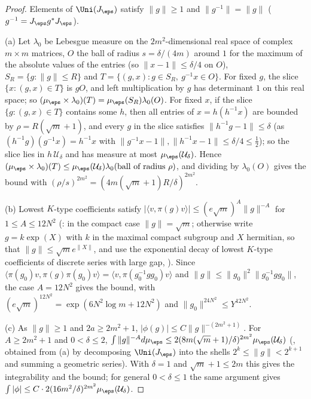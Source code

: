 \begin{proof}
Elements of $\Uni(J_\eps)$ satisfy $\|g\|\ge1$ and $\|g^{-1}\|=\|g\|$ ($g^{-1}=J_\eps g^*J_\eps$).

(a) Let $\lambda_0$ be Lebesgue measure on the $2m^2$-dimensional real space of complex $m\times m$ matrices, $O$ the ball of radius
$s=\delta/(4m)$ around $1$ for the maximum of the absolute values of the entries (so $\|x-1\|\le\delta/4$ on $O$), $S_R=\{g:\|g\|\le R\}$ and
$T=\{(g,x):g\in S_R,\ g^{-1}x\in O\}$. For fixed $g$, the slice $\{x:(g,x)\in T\}$ is $gO$, and left multiplication by $g$ has determinant $1$ on
this real space; so $(\mu_\eps\times\lambda_0)(T)=\mu_\eps(S_R)\lambda_0(O)$. For fixed $x$, if the slice $\{g:(g,x)\in T\}$ contains some $h$, then all entries
of $x=h(h^{-1}x)$ are bounded by $\rho=R(\sqrt m+1)$, and every $g$ in the slice satisfies $\|h^{-1}g-1\|\le\delta$ (as $(h^{-1}g)(g^{-1}x)=h^{-1}x$ with
$\|g^{-1}x-1\|,\|h^{-1}x-1\|\le\delta/4\le\frac12$); so the slice lies in $h\,\mathcal U_\delta$ and has measure at most $\mu_\eps(\mathcal U_\delta)$. Hence
$(\mu_\eps\times\lambda_0)(T)\le\mu_\eps(\mathcal U_\delta)\lambda_0(\text{ball of radius }\rho)$, and dividing by $\lambda_0(O)$ gives the bound with
$(\rho/s)^{2m^2}=(4m(\sqrt m+1)R/\delta)^{2m^2}$.

(b) Lowest $K$-type coefficients satisfy $|\langle v,\pi(g)v\rangle|\le(e\sqrt m)^A\|g\|^{-A}$ for $1\le A\le12N^2$
(: in the compact case $\|g\|=\sqrt m$; otherwise write $g=k\exp(X)$ with $k$ in the maximal compact
subgroup and $X$ hermitian, so that $\|g\|\le\sqrt me^{\|X\|}$, and use the exponential decay of lowest $K$-type coefficients of discrete series with
large gap, ). Since
$\langle\pi(g_0)v,\pi(g)\pi(g_0)v\rangle=\langle v,\pi(g_0^{-1}gg_0)v\rangle$ and $\|g\|\le\|g_0\|^2\|g_0^{-1}gg_0\|$, the case $A=12N^2$ gives the bound,
with $(e\sqrt m)^{12N^2}=\exp(6N^2\log m+12N^2)$ and $\|g_0\|^{24N^2}\le Y^{12N^2}$.

(c) As $\|g\|\ge1$ and $2a\ge2m^2+1$, $|\phi(g)|\le C\|g\|^{-(2m^2+1)}$. For $A\ge2m^2+1$ and $0<\delta\le2$,
$\int\|g\|^{-A}d\mu_\eps\le2(8m(\sqrt m+1)/\delta)^{2m^2}\mu_\eps(\mathcal U_\delta)$ (, obtained from (a) by
decomposing $\Uni(J_\eps)$ into the shells $2^k\le\|g\|<2^{k+1}$ and summing a geometric series). With $\delta=1$ and $\sqrt m+1\le2m$ this gives the
integrability and the bound; for general $0<\delta\le1$ the same argument gives $\int|\phi|\le C\cdot2(16m^2/\delta)^{2m^2}\mu_\eps(\mathcal U_\delta)$.


\end{proof}
